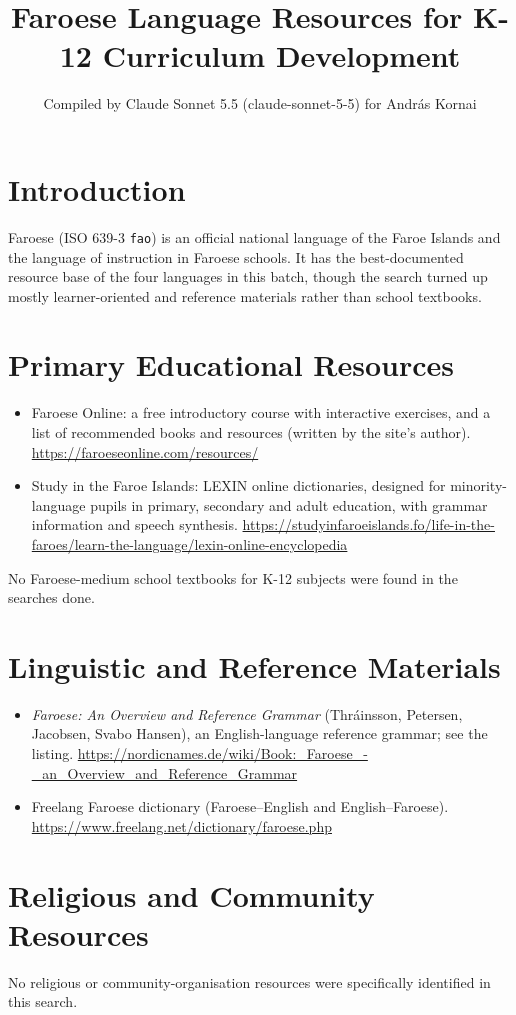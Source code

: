 \documentclass[12pt]{article}
\title{Faroese Language Resources for K-12 Curriculum Development}
\author{Compiled by Claude Sonnet 5.5 (claude-sonnet-5-5) for Andr\'as Kornai}
\date{}
\begin{document}
\maketitle

\section{Introduction}
Faroese (ISO 639-3 \texttt{fao}) is an official national language of the Faroe Islands and the language of instruction in Faroese schools. It has the best-documented resource base of the four languages in this batch, though the search turned up mostly learner-oriented and reference materials rather than school textbooks.

\section{Primary Educational Resources}
\begin{itemize}
\item Faroese Online: a free introductory course with interactive exercises, and a list of recommended books and resources (written by the site's author). \url{https://faroeseonline.com/resources/}
\item Study in the Faroe Islands: LEXIN online dictionaries, designed for minority-language pupils in primary, secondary and adult education, with grammar information and speech synthesis. \url{https://studyinfaroeislands.fo/life-in-the-faroes/learn-the-language/lexin-online-encyclopedia}
\end{itemize}
No Faroese-medium school textbooks for K-12 subjects were found in the searches done.

\section{Linguistic and Reference Materials}
\begin{itemize}
\item \emph{Faroese: An Overview and Reference Grammar} (Thr\'ainsson, Petersen, Jacobsen, Svabo Hansen), an English-language reference grammar; see the listing. \url{https://nordicnames.de/wiki/Book:_Faroese_-_an_Overview_and_Reference_Grammar}
\item Freelang Faroese dictionary (Faroese--English and English--Faroese). \url{https://www.freelang.net/dictionary/faroese.php}
\end{itemize}

\section{Religious and Community Resources}
No religious or community-organisation resources were specifically identified in this search.
\end{document}
